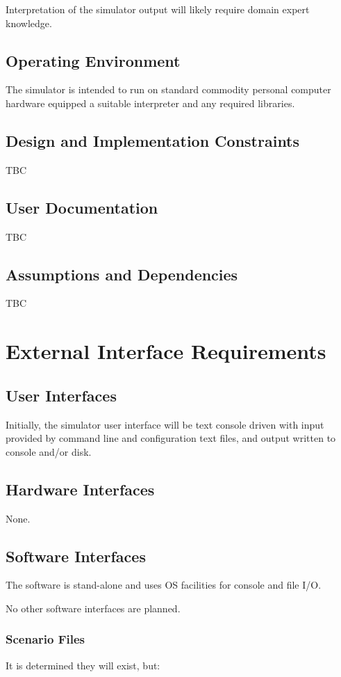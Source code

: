 \documentclass{scrreprt}
\begin{document}
Interpretation of the simulator output will likely require domain expert knowledge.


\section{Operating Environment}
The simulator is intended to run on standard commodity personal computer hardware
equipped a suitable interpreter and any required libraries.


\section{Design and Implementation Constraints}
TBC

\section{User Documentation}
TBC


\section{Assumptions and Dependencies}
TBC


\chapter{External Interface Requirements}

\section{User Interfaces}
Initially, the simulator user interface will be text console driven with input
provided by command line and configuration text files, and output written to
console and/or disk.

\section{Hardware Interfaces}
None.

\section{Software Interfaces}
The software is stand-alone and uses OS facilities for console and file I/O.

No other software interfaces are planned.

\subsection{Scenario Files}
It is determined they will exist, but:
\end{document}
